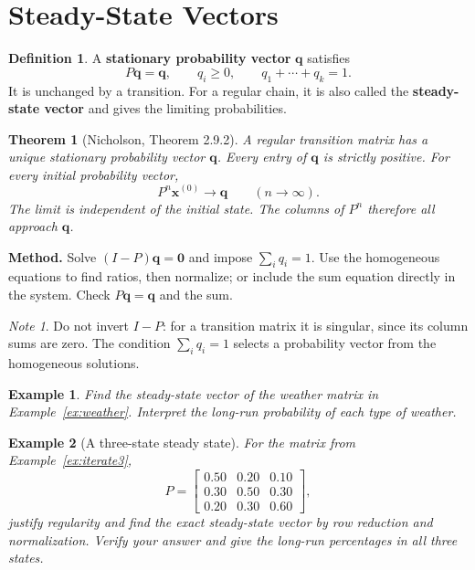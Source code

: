 \documentclass{article}
\theoremstyle{plain}
\newtheorem{theorem}{Theorem}[section]
\newtheorem{example}{Example}[section]
\theoremstyle{definition}
\newtheorem{definition}{Definition}[section]
\theoremstyle{remark}
\newtheorem*{note}{Note}
\renewcommand{\vec}[1]{\mathbf{#1}}
\newcommand{\work}{\par\vfill}
\begin{document}
\section{Steady-State Vectors}
\begin{definition}
A \textbf{stationary probability vector} $\vec{q}$ satisfies
\[
\boxed{P\vec{q}=\vec{q},\qquad q_i\ge0,\qquad q_1+\cdots+q_k=1}.
\]
It is unchanged by a transition. For a regular chain, it is also called the \textbf{steady-state vector} and gives the limiting probabilities.
\end{definition}
\begin{theorem}[Nicholson, Theorem 2.9.2]
A regular transition matrix has a unique stationary probability vector $\vec{q}$. Every entry of $\vec{q}$ is strictly positive. For every initial probability vector,
\[
P^n\vec{x}^{(0)}\longrightarrow\vec{q}\qquad(n\longrightarrow\infty).
\]
The limit is independent of the initial state. The columns of $P^n$ therefore all approach $\vec{q}$.
\end{theorem}
\textbf{Method.} Solve $(I-P)\vec{q}=\vec{0}$ and impose $\sum_iq_i=1$. Use the homogeneous equations to find ratios, then normalize; or include the sum equation directly in the system. Check $P\vec{q}=\vec{q}$ and the sum.
\begin{note}
Do not invert $I-P$: for a transition matrix it is singular, since its column sums are zero. The condition $\sum_iq_i=1$ selects a probability vector from the homogeneous solutions.
\end{note}
\begin{example}\label{ex:steady2}
Find the steady-state vector of the weather matrix in Example~\ref{ex:weather}. Interpret the long-run probability of each type of weather.
\end{example}

\work

\newpage
\begin{example}[A three-state steady state]\label{ex:steady3}
For the matrix from Example~\ref{ex:iterate3},
\[
P=\begin{bmatrix}0.50&0.20&0.10\\0.30&0.50&0.30\\0.20&0.30&0.60\end{bmatrix},
\]
justify regularity and find the exact steady-state vector by row reduction and normalization. Verify your answer and give the long-run percentages in all three states.
\end{example}

\work
\end{document}
